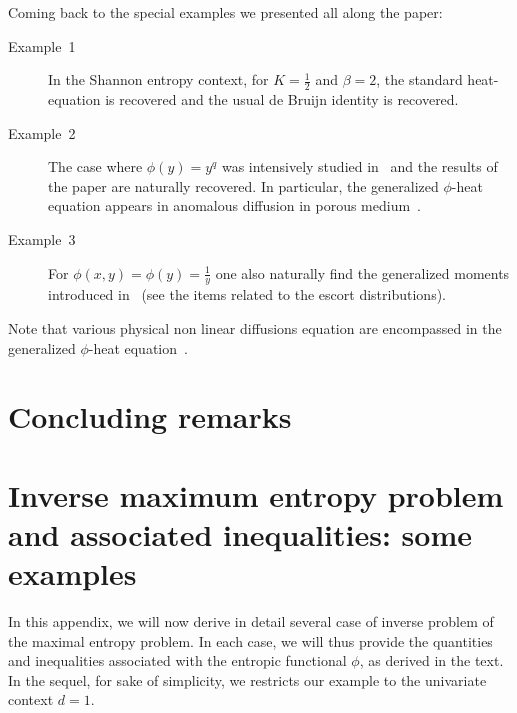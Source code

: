 \documentclass[english,sort&compress]{elsarticle}
\theoremstyle{definition}
\theoremstyle{plain}
\theoremstyle{plain}
\begin{document}
Coming back to the special examples we presented all along the paper:
%
\begin{description}%
\item[Example~1]    In   the  Shannon entropy
context, for $K = \frac12$ and $\beta  = 2$, the
standard  heat-equation  is recovered and the usual de Bruijn identity is recovered.
%
\item[Example~2]  The  case  where  $\phi(y)  =  y^q$  was  intensively  studied
  in~\cite{Ber13:08} and the  results of the paper are  naturally recovered.  In
  particular,  the   generalized  $\phi$-heat  equation   appears  in  anomalous
  diffusion in porous medium~\cite{TsaLen02, Ber13:08, Vaz06}.
%
\item[Example~3] For $\phi(x,y) = \phi(y) = \frac{1}{y}$ one also naturally find
  the generalized moments  introduced in~\cite{TsaMen98,MarNic00} (see the items
  related to the escort distributions).
\end{description}

Note that various physical non linear diffusions equation are encompassed in the
generalized $\phi$-heat equation~\cite{GilKer04, Vaz06}.




\section{Concluding remarks}
\label{sec:Conclusion}



\appendix

\section{Inverse  maximum  entropy  problem  and associated  inequalities:  some
  examples}

In this appendix, we  will now derive in detail several  case of inverse problem
of  the  maximal  entropy problem.  In  each  case,  we  will thus  provide  the
quantities and inequalities  associated with the entropic  functional $\phi$, as
derived in  the text. In  the sequel, for sake  of simplicity, we  restricts our
example to the univariate context $d = 1$.
\end{document}
